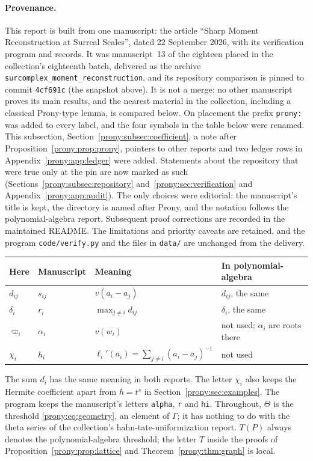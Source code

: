 \documentclass[11pt,letterpaper]{article}
\theoremstyle{definition}
\theoremstyle{remark}
\newcommand{\lbl}[1]{\nolinkurl{#1}}%
\begin{document}
\paragraph{Provenance.}
This report is built from one manuscript: the article ``Sharp Moment
Reconstruction at Surreal Scales'', dated 22 September 2026, with its
verification program and records. It was manuscript~13 of the eighteen placed
in the collection's eighteenth batch, delivered as the archive
\texttt{surcomplex\_moment\_reconstruction}, and its repository comparison is
pinned to commit \texttt{4cf691c} (the snapshot above). It is not a merge: no
other manuscript proves its main results, and the nearest material in the
collection, including a classical Prony-type lemma, is compared below. On placement the prefix \lbl{prony:} was
added to every label, and the four symbols in the table below were renamed.
This subsection, Section~\ref{prony:subsec:coefficient}, a note after
Proposition~\ref{prony:prop:prony}, pointers to other reports and two ledger
rows in Appendix~\ref{prony:app:ledger} were added. Statements about the
repository that were true only at the pin are now marked as such
(Sections~\ref{prony:subsec:repository} and~\ref{prony:sec:verification}
and Appendix~\ref{prony:app:audit}). The only choices were editorial: the
manuscript's title is kept, the directory is named after Prony, and the
notation follows the polynomial-algebra report. Subsequent proof corrections
are recorded in the maintained README. The limitations and priority caveats
are retained, and
the program \lbl{code/verify.py} and the files in \lbl{data/} are
unchanged from the delivery.
\begin{center}
\begin{tabular}{@{}llll@{}}
\toprule
Here & Manuscript & Meaning & In polynomial-algebra\\
\midrule
$d_{ij}$ & $s_{ij}$ & $v(a_i-a_j)$ & $d_{ij}$, the same\\
$\delta_i$ & $r_i$ & $\max_{j\ne i}d_{ij}$ & $\delta_i$, the same\\
$\varpi_i$ & $\alpha_i$ & $v(w_i)$ & not used; $\alpha_i$ are roots there\\
$\chi_i$ & $h_i$ & $\ell_i'(a_i)=\sum_{j\ne i}(a_i-a_j)^{-1}$ & not used\\
\bottomrule
\end{tabular}
\end{center}
The sum $d_i$ has the same meaning in both reports. The letter $\chi_i$ also
keeps the Hermite coefficient apart from $h=t^s$ in
Section~\ref{prony:sec:examples}. The program keeps the manuscript's letters
\texttt{alpha}, \texttt{r} and \texttt{hi}. Throughout, $\Theta$ is the
threshold \eqref{prony:eq:geometry}, an element of $\Gamma$; it has nothing to
do with the theta series of the collection's hahn-tate-uniformization
report. $T(P)$ always denotes the polynomial-algebra threshold; the letter $T$
inside the proofs of Proposition~\ref{prony:prop:lattice} and
Theorem~\ref{prony:thm:graph} is local.
\end{document}
